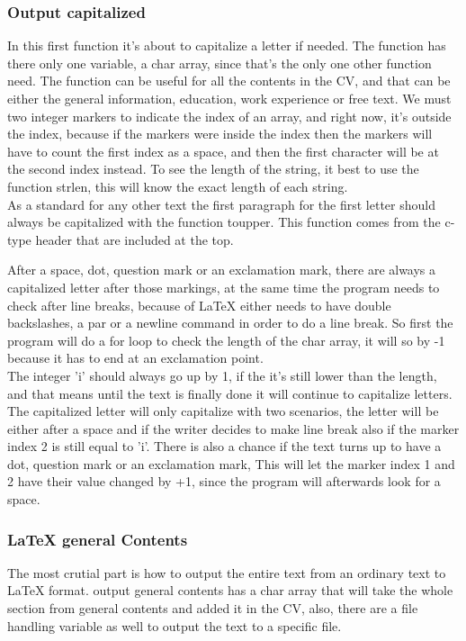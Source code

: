 \subsubsection{Output capitalized}
In this first function it's about to capitalize a letter if needed.
The function has there only one variable, a char array, since that's the only one other function need.
The function can be useful for all the contents in the CV,
and that can be either the general information, education, work experience or free text.
We must two integer markers to indicate the index of an array, 
and right now, it's outside the index, because if the markers were inside the index 
then the markers will have to count the first index as a space, 
and then the first character will be at the second index instead. %
To see the length of the string, it best to use the function strlen, this will know the exact length of each string. \\

As a standard for any other text the first paragraph for the first letter should always be capitalized with the function toupper.
This function comes from the c-type header that are included at the top.

After a space, dot, question mark or an exclamation mark, there are always a capitalized letter after those markings,
at the same time the program needs to check after line breaks, 
because of LaTeX either needs to have double backslashes, a par or a newline command
in order to do a line break. So first the program will do a for loop to check the length of the char array,
it will so by -1 because it has to end at an exclamation point.\\

The integer 'i' should always go up by 1, if the it's still lower than the length, and that means until the text is finally done 
it will continue to capitalize letters. The capitalized letter will only capitalize with two scenarios, 
the letter will be either after a space and if the writer decides to make line break also if the marker index 2 is still equal to 'i'.
There is also a chance if the text turns up to have a dot, question mark or an exclamation mark, 
This will let the marker index 1 and 2 have their value changed by +1, since the program will afterwards look for a space.\\

\subsubsection{LaTeX general Contents}
The most crutial part is how to output the entire text from an ordinary text to LaTeX format.
output general contents has a char array that will take the whole section from general contents and added it in the CV,
also, there are a file handling variable as well to output the text to a specific file. 

